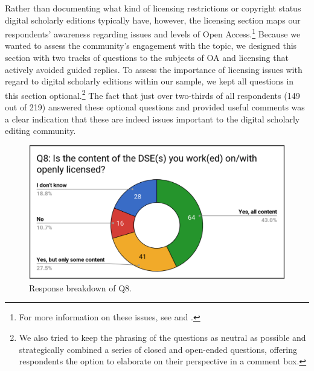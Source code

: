 \begin{paper}
Rather than documenting what kind of licensing restrictions or copyright
status digital scholarly editions typically have, however, the licensing
section maps our respondents' awareness regarding issues and levels of
Open Access.\footnote{For more information on these issues, see \citealt{dillen_digital_2016} and \citealt{sichani_refining_2017}.} Because we wanted to assess the
community's engagement with the topic, we designed this section with two
tracks of questions to the subjects of OA and licensing that actively
avoided guided replies. To assess the importance of licensing issues
with regard to digital scholarly editions within our sample, we kept all
questions in this section optional.\footnote{We also tried to keep the
  phrasing of the questions as neutral as possible and strategically
  combined a series of closed and open-ended questions, offering
  respondents the option to elaborate on their perspective in a comment
  box.} The fact that just over two-thirds of all respondents (149 out
of 219) answered these optional questions and provided useful comments
was a clear indication that these are indeed issues important to the
digital scholarly editing community.

\begin{figure}[!ht]
\includegraphics[width=\textwidth]{media/martinez2.png}
\caption{Response breakdown of Q8.}
\label{q8}
\end{figure}


\end{paper}
